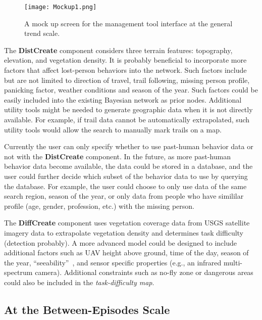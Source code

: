 \begin{figure}
\centering
\texttt{[image: Mockup1.png]}
\caption{A mock up screen for the management tool interface at the general trend scale.}
\label{Mockup1}
\end{figure}

The \textbf{DistCreate} component considers three terrain features: topography, elevation, and vegetation density. It is probably beneficial to incorporate more factors that affect lost-person behaviors into the network. Such factors include but are not limited to direction of travel, trail following, missing person profile, panicking factor, weather conditions and season of the year. Such factors could be easily included into the existing Bayesian network as prior nodes. Additional utility tools might be needed to generate geographic data when it is not directly available. For example, if trail data cannot be automatically extrapolated, such utility tools would allow the search to manually mark trails on a map.

Currently the user can only specify whether to use past-human behavior data or not with the \textbf{DistCreate} component. In the future, as more past-human behavior data become available, the data could be stored in a database, and the user could further decide which subset of the behavior data to use by querying the database. For example, the user could choose to only use data of the same search region, season of the year, or only data from people who have simililar profile (age, gender, profession, etc.) with the missing person.

The \textbf{DiffCreate} component uses vegetation coverage data from USGS satellite imagery data to extrapolate vegetation density and determines task difficulty (detection probably). A more advanced model could be designed to include additional factors such as UAV height above ground, time of the day, season of the year, ``seeability''~\cite{Morse2010UAV}, and sensor specific properties (e.g., an infrared multi-spectrum camera). Additional constraints such as no-fly zone or dangerous areas could also be included in the \textit{task-difficulty map}.

\subsection{At the Between-Episodes Scale}

